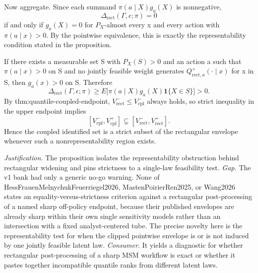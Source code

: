 \documentclass{article}
\begin{document}
Now aggregate. Since each summand \(\pi(a\mid X)g_a(X)\) is nonnegative,
\[
\Delta_{\mathrm{rect}}(\Gamma,\epsilon;\pi)=0
\]
if and only if \(g_a(X)=0\) for \(P_X\)-almost every x and every action with \(\pi(a\mid x)>0\). By the pointwise equivalence, this is exactly the representability condition stated in the proposition.

If there exists a measurable set S with \(P_X(S)>0\) and an action a such that \(\pi(a\mid x)>0\) on S and no jointly feasible weight generates \(Q_{\mathrm{rect},a}^+(\cdot\mid x)\) for x in S, then \(g_a(x)>0\) on S. Therefore
\[
\Delta_{\mathrm{rect}}(\Gamma,\epsilon;\pi)\ge E\big[\pi(a\mid X)g_a(X)\mathbf 1\{X\in S\}\big]>0.
\]
By thm:quantile-coupled-endpoint, \(V_{\mathrm{rect}}^-\le V_{\mathrm{cpl}}^-\) always holds, so strict inequality in the upper endpoint implies
\[
[V_{\mathrm{cpl}}^-,V_{\mathrm{cpl}}^+]\subsetneq [V_{\mathrm{rect}}^-,V_{\mathrm{rect}}^+].
\]
Hence the coupled identified set is a strict subset of the rectangular envelope whenever such a nonrepresentability region exists.
\par\smallskip\noindent \textit{Justification.} The proposition isolates the representability obstruction behind rectangular widening and pins strictness to a single-law feasibility test. \textit{Gap.} The v1 bank had only a generic no-go warning. None of HessFrauenMelnychukFeuerriegel2026, MastenPoirierRen2025, or Wang2026 states an equality-versus-strictness criterion against a rectangular post-processing of a named sharp off-policy endpoint, because their published envelopes are already sharp within their own single sensitivity models rather than an intersection with a fixed analyst-centered tube. The precise novelty here is the representability test for when the clipped pointwise envelope is or is not induced by one jointly feasible latent law. \textit{Consumer.} It yields a diagnostic for whether rectangular post-processing of a sharp MSM workflow is exact or whether it pastes together incompatible quantile ranks from different latent laws.
\end{document}
